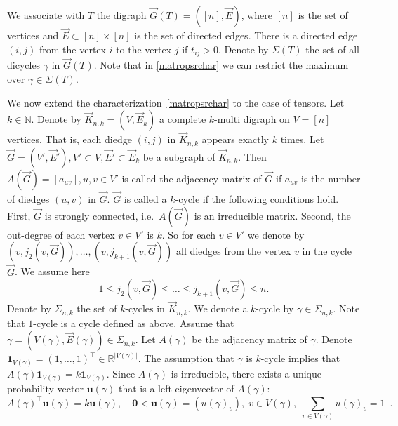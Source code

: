 \documentclass{amsart}
\newcommand{\digraph}{\vec{G}}
\newcommand{\diedges}{\vec{E}}
\newcommand{\kdigraph}{\vec{K}}
\newcommand{\Arcs}{\diedges}
\newcommand{\N}{\mathbb{N}}
\newcommand{\R}{\mathbb{R}}
\newcommand{\uu}{\mathbf{u}}
\newcommand{\0}{\mathbf{0}}
\newcommand{\1}{\mathbf{1}}
\newcommand{\trans}{^\top}
\theoremstyle{remark}
\numberwithin{equation}{section} %
\renewcommand{\le}{\leqslant}
\begin{document}
We associate with $T$ the digraph $\digraph(T)=([n],\diedges)$, where $[n]$ is the set of vertices and $\diedges\subset [n]\times [n]$ is the set of directed edges.
There is a directed edge $(i,j)$ from the vertex $i$ to the vertex $j$ if $t_{ij}>0$.    Denote by $\Sigma(T)$ the set of all dicycles $\gamma$ in $\digraph(T)$.  Note that in \eqref{matropsrchar} we can restrict the maximum  over $\gamma\in \Sigma(T)$.


We now extend the characterization~\eqref{matropsrchar} to the case of tensors.
Let $k\in\N$.  Denote by $\kdigraph_{n,k}=(V,\Arcs_k)$ a complete $k$-multi digraph on $V=[n]$ vertices.  That is, each diedge $(i,j)$ in $\kdigraph_{n,k}$ appears exactly
 $k$ times.  Let $\digraph=(V',\Arcs'), V'\subset V, \Arcs'\subset \Arcs_k$ be a subgraph of $\kdigraph_{n,k}$.
 Then $A(\digraph)=[a_{uv}], u,v\in V'$ is called the adjacency matrix of $\digraph$ if $a_{uv}$ is the number of diedges $(u,v)$ in $\digraph$.  $\digraph$
 is called a $k$-cycle if the following conditions hold. First, $\digraph$ is strongly connected, i.e.\ $A(\digraph)$ is an irreducible matrix.
 Second, the out-degree of each vertex $v\in V'$ is $k$.  So for each $v\in V'$ we denote by $(v,j_2(v,\digraph)),\ldots,(v,j_{k+1}(v,\digraph))$
 all diedges from the vertex $v$ in the cycle $\digraph$.  We assume here
 \begin{equation}\label{vertoutv}
 1\le j_2(v,\digraph)\le \ldots\le j_{k+1}(v,\digraph)\le n.
 \end{equation}
 Denote by $\Sigma_{n,k}$ the set of $k$-cycles in $\kdigraph_{n,k}$.  We denote a $k$-cycle by
 $\gamma\in\Sigma_{n,k}$.  Note that $1$-cycle is a cycle defined as above.  Assume that $\gamma=(V(\gamma),\Arcs(\gamma))\in\Sigma_{n,k}$.  Let $A(\gamma)$ be the adjacency matrix of $\gamma$.  Denote $\1_{V(\gamma)}=(1,\ldots,1)\trans\in \R^{|V(\gamma)|}$.  The assumption that $\gamma$ is $k$-cycle implies that
 $A(\gamma)\1_{V(\gamma)}=k\1_{V(\gamma)}$.  Since $A(\gamma)$ is irreducible, there exists a unique probability vector $\uu(\gamma)$ that is a left eigenvector of $A(\gamma)$:
 \begin{equation}\label{defleAgam}
  A(\gamma)\trans \uu(\gamma)=k\uu(\gamma), \quad \0<\uu(\gamma)=(u(\gamma)_v),\;v\in V(\gamma),\;\sum_{v\in V(\gamma)} u(\gamma)_v=1 \enspace.
 \end{equation}
\end{document}
